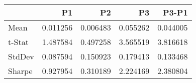 \begin{tabular}{lrrrr}
\toprule
 & P1 & P2 & P3 & P3-P1 \\
\midrule
Mean & 0.011256 & 0.006483 & 0.055262 & 0.044005 \\
t-Stat & 1.487584 & 0.497258 & 3.565519 & 3.816618 \\
StdDev & 0.087594 & 0.150923 & 0.179413 & 0.133468 \\
Sharpe & 0.927954 & 0.310189 & 2.224169 & 2.380804 \\
\bottomrule
\end{tabular}

